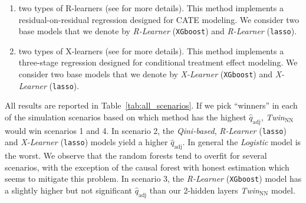 \documentclass{article}
\def\qadj{\hat{q}_{\mathrm{adj}}}
\begin{document}
\begin{enumerate}
    \item[(f)] two types of R-learners (see \cite{NieWager2020Quasi} for more details). This method implements a residual-on-residual regression designed for CATE modeling. We consider two base models that we denote by {\it R-Learner }(\texttt{XGboost}) and {\it R-Learner }(\texttt{lasso}).
    \item[(g)] two types of X-learners (see \cite{kunzel2019metalearners} for more details). This method implements a three-stage regression designed for conditional treatment effect modeling. We consider two base models that we denote by {\it X-Learner }(\texttt{XGboost}) and {\it X-Learner }(\texttt{lasso}).
\end{enumerate}

\vspace{5mm}

All results are reported in Table~\ref{tab:all_scenarios}. If we pick “winners” in each of the simulation scenarios based on which method has the highest $\qadj$, {\it Twin$_{\mathrm{NN}}$} would win scenarios 1 and 4. In scenario 2, the {\it Qini-based}, {\it R-Learner }(\texttt{lasso}) and {\it X-Learner }(\texttt{lasso}) models yield a higher $\qadj$. In general the {\it Logistic} model is the worst. We observe that the random forests tend to overfit for several scenarios, with the exception of the causal forest with honest estimation which seems to mitigate this problem. In scenario 3, the {\it R-Learner }(\texttt{XGboost}) model has a slightly higher but not significant $\qadj$ than our 2-hidden layers {\it Twin$_{\mathrm{NN}}$} model.
\end{document}
